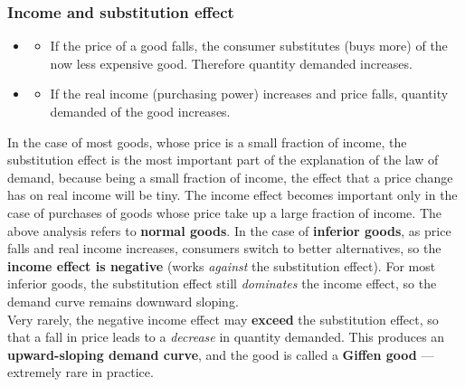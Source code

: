 \subsubsection*{Income and substitution effect}
\begin{itemize}
  \item {}
  \begin{itemize}
    \item If the price of a good falls, the consumer substitutes (buys more) of the now less expensive good. Therefore quantity demanded increases. 
  \end{itemize}
  \item {}
  \begin{itemize}
    \item If the real income (purchasing power) increases and price falls, quantity demanded of the good increases.
  \end{itemize}
\end{itemize}
In the case of most goods, whose price is a small fraction of income, the substitution effect is the most important part of the explanation of the law of demand, because being a small fraction of income, the effect that a price change has on real income will be tiny. The income effect becomes important only in the case of purchases of goods whose price take up a large fraction of income.
The above analysis refers to \textbf{normal goods}. In the case of \textbf{inferior goods}, as price falls and real income increases, consumers switch to better alternatives, so the \textbf{income effect is negative} (works \textit{against} the substitution effect). For most inferior goods, the substitution effect still \textit{dominates} the income effect, so the demand curve remains downward sloping.\\
Very rarely, the negative income effect may \textbf{exceed} the substitution effect, so that a fall in price leads to a \textit{decrease} in quantity demanded. This produces an \textbf{upward-sloping demand curve}, and the good is called a \textbf{Giffen good} --- extremely rare in practice.
\begin{center}
\end{center}
